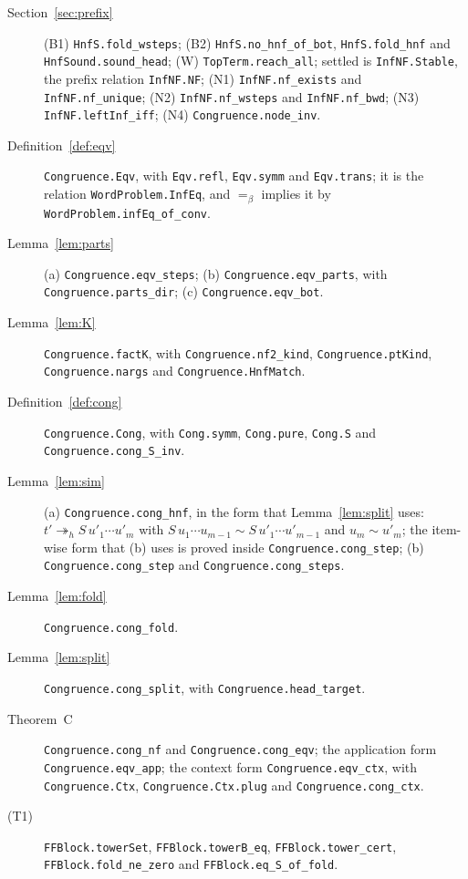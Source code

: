 \documentclass[11pt]{amsart}
\theoremstyle{definition}
\newcommand{\hred}{\twoheadrightarrow_h}
\newcommand{\conv}{=_\beta}
\newcommand{\cg}{\sim}
\begin{document}
{\raggedright
\begin{description}
\item[Section~\ref{sec:prefix}] (B1) \texttt{HnfS.fold\_wsteps}; (B2) \texttt{HnfS.no\_hnf\_of\_bot},
\texttt{HnfS.fold\_hnf} and \texttt{HnfSound.sound\_head}; (W) \texttt{TopTerm.reach\_all}; settled is
\texttt{InfNF.Stable}, the prefix relation \texttt{InfNF.NF}; (N1) \texttt{InfNF.nf\_exists} and
\texttt{InfNF.nf\_unique}; (N2) \texttt{InfNF.nf\_wsteps} and \texttt{InfNF.nf\_bwd}; (N3)
\texttt{InfNF.leftInf\_iff}; (N4) \texttt{Congruence.node\_inv}.
\item[Definition~\ref{def:eqv}] \texttt{Congruence.Eqv}, with \texttt{Eqv.refl}, \texttt{Eqv.symm} and
\texttt{Eqv.trans}; it is the relation \texttt{WordProblem.InfEq}, and $\conv$ implies it by
\texttt{WordProblem.infEq\_of\_conv}.
\item[Lemma~\ref{lem:parts}] (a) \texttt{Congruence.eqv\_steps}; (b) \texttt{Congruence.eqv\_parts},
with \texttt{Congruence.parts\_dir}; (c) \texttt{Congruence.eqv\_bot}.
\item[Lemma~\ref{lem:K}] \texttt{Congruence.factK}, with \texttt{Congruence.nf2\_kind},
\texttt{Congruence.ptKind}, \texttt{Congruence.nargs} and \texttt{Congruence.HnfMatch}.
\item[Definition~\ref{def:cong}] \texttt{Congruence.Cong}, with \texttt{Cong.symm}, \texttt{Cong.pure},
\texttt{Cong.S} and \texttt{Congruence.cong\_S\_inv}.
\item[Lemma~\ref{lem:sim}] (a) \texttt{Congruence.cong\_hnf}, in the form that Lemma~\ref{lem:split}
uses: $t'\hred S\,u'_1\cdots u'_m$ with $S\,u_1\cdots u_{m-1}\cg S\,u'_1\cdots u'_{m-1}$ and $u_m\cg
u'_m$; the item-wise form that (b) uses is proved inside \texttt{Congruence.cong\_step}; (b) \texttt{Congruence.cong\_step} and
\texttt{Congruence.cong\_steps}.
\item[Lemma~\ref{lem:fold}] \texttt{Congruence.cong\_fold}.
\item[Lemma~\ref{lem:split}] \texttt{Congruence.cong\_split}, with \texttt{Congruence.head\_target}.
\item[Theorem~C] \texttt{Congruence.cong\_nf} and \texttt{Congruence.cong\_eqv}; the application form
\texttt{Congruence.eqv\_app}; the context form \texttt{Congruence.eqv\_ctx}, with
\texttt{Congruence.Ctx}, \texttt{Congruence.Ctx.plug} and \texttt{Congruence.cong\_ctx}.
\item[(T1)] \texttt{FFBlock.towerSet}, \texttt{FFBlock.towerB\_eq}, \texttt{FFBlock.tower\_cert},
\texttt{FFBlock.fold\_ne\_zero} and \texttt{FFBlock.eq\_S\_of\_fold}.

\end{description}}
\end{document}
